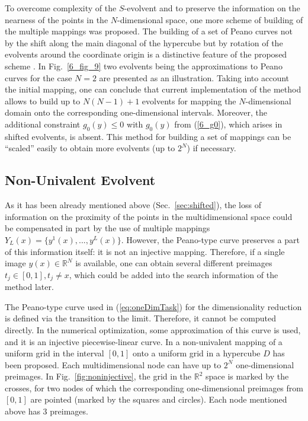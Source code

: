 \documentclass[runningheads]{llncs}
\begin{document}
To overcome complexity of the $S$-evolvent and to preserve the information on the nearness of the points in
the $N$-dimensional space, one more scheme of building of the multiple mappings was proposed.
The building of a set of Peano curves not by the shift along the main diagonal of the hypercube
but by rotation of the evolvents around the coordinate origin is a distinctive feature of the
proposed scheme \cite{Gergel2009}.
In Fig.~\ref{6_fig_9} two evolvents being the approximations to Peano curves for the case
$N=2$ are presented as an illustration.
Taking into account the initial mapping, one can conclude that current implementation of the
method allows to build up to $N(N-1)+1$ evolvents for mapping the $N$-dimensional domain
onto the corresponding one-dimensional intervals. Moreover, the additional constraint  $g_0(y)
\leq 0$ with $g_0(y)$ from (\ref{6_g0}), which arises in shifted evolvents, is absent. This
method for building a set of mappings can be ``scaled'' easily to obtain more evolvents (up to
$2^N$) if necessary.


\subsection{Non-Univalent Evolvent}

As it has been already mentioned above (Sec.~\ref{sec:shifted}), the loss of information on the
proximity of the points in the multidimensional space could be compensated in part by the use
of multiple mappings $Y_L(x)=\{y^1(x),...,y^L(x)\}$. However, the Peano-type curve preserves
a part of this information itself: it is not an injective mapping. Therefore, if a single image
$y(x)\in \mathbb{R}^N$ is available, one can obtain several different preimages
$t_j\in[0,1], t_j \not = x$, which could be added into the search information of the method later.

The Peano-type curve used in (\ref{eq:oneDimTask}) for the dimensionality reduction is
defined via the transition to the limit. Therefore, it cannot be computed directly. In the
numerical optimization, some approximation of this curve is used, and it is an injective piecewise-linear curve. In \cite{strongin1978} a non-univalent mapping of a uniform grid in the
interval $[0,1]$ onto a uniform grid in a hypercube $D$ has been proposed. Each
multidimensional node can have up to $2^N$ one-dimensional preimages. In
Fig.~\ref{fig:noninjective}, the grid in the $\mathbb{R}^2$ space is marked by the crosses, for
two nodes of which the corresponding one-dimensional preimages from $[0,1]$ are pointed
(marked by the squares and circles). Each node mentioned above has 3 preimages.
\end{document}

